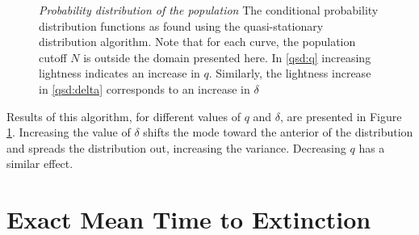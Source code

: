 \documentclass[a4paper,10pt]{article}
\numberwithin{equation}{section} %
\begin{document}
\begin{figure}[ht!]
	\centering
	\hfill
	\caption{\emph{Probability distribution of the population} The conditional probability distribution functions as found using the quasi-stationary distribution algorithm. Note that for each curve, the population cutoff $N$ is outside the domain presented here. In \ref{qsd:q} increasing lightness indicates an increase in $q$. Similarly, the lightness increase in \ref{qsd:delta} corresponds to an increase in $\delta$}
	\label{qsd}
\end{figure}

Results of this algorithm, for different values of $q$ and $\delta$, are presented in Figure \ref{qsd}. 
Increasing the value of $\delta$ shifts the mode toward the anterior of the distribution and spreads the distribution out, increasing the variance. 
Decreasing $q$ has a similar effect. %








\section{Exact Mean Time to Extinction}%
\end{document}
